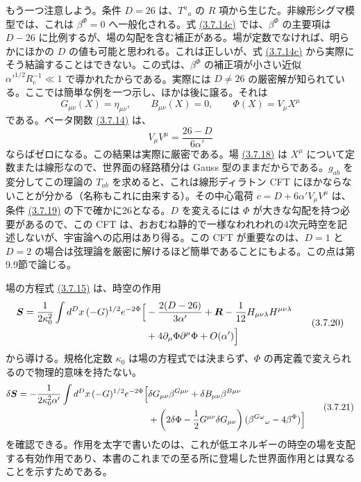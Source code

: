 もう一つ注意しよう。条件 $D=26$ は、$T^a{}_a$ の $R$ 項から生じた。非線形シグマ模型では、これは $\beta^\Phi=0$ へ一般化される。式 \hyperref[eq:3.7.14c]{(3.7.14c)} では、$\beta^\Phi$ の主要項は $D-26$ に比例するが、場の勾配を含む補正がある。場が定数でなければ、明らかにほかの $D$ の値も可能と思われる。これは正しいが、式 \hyperref[eq:3.7.14c]{(3.7.14c)} から実際にそう結論することはできない。この式は、$\beta^\Phi$ の補正項が小さい近似 $\alpha'^{1/2}R_{\mathrm c}^{-1}\ll1$ で導かれたからである。実際には $D\ne26$ の厳密解が知られている。ここでは簡単な例を一つ示し、ほかは後に譲る。それは
\begin{equation}
G_{\mu\nu}(X)=\eta_{\mu\nu},\qquad
B_{\mu\nu}(X)=0,\qquad
\Phi(X)=V_\mu X^\mu
\tag{3.7.18}\label{eq:3.7.18}
\end{equation}
である。ベータ関数 \hyperref[eq:3.7.14a]{(3.7.14)} は、
\begin{equation}
V_\mu V^\mu=\frac{26-D}{6\alpha'}
\tag{3.7.19}\label{eq:3.7.19}
\end{equation}
ならばゼロになる。この結果は実際に厳密である。場 \hyperref[eq:3.7.18]{(3.7.18)} は $X^\mu$ について定数または線形なので、世界面の経路積分は Gauss 型のままだからである。$g_{ab}$ を変分してこの理論の $T_{ab}$ を求めると、これは線形ディラトン CFT にほかならないことが分かる（名称もこれに由来する）。その中心電荷 $c=D+6\alpha'V_\mu V^\mu$ は、条件 \hyperref[eq:3.7.19]{(3.7.19)} の下で確かに26となる。$D$ を変えるには $\Phi$ が大きな勾配を持つ必要があるので、この CFT は、おおむね静的で一様なわれわれの4次元時空を記述しないが、宇宙論への応用はあり得る。この CFT が重要なのは、$D=1$ と $D=2$ の場合は弦理論を厳密に解けるほど簡単であることにもよる。この点は第9.9節で論じる。


場の方程式 \hyperref[eq:3.7.15]{(3.7.15)} は、時空の作用
\begin{equation}
\begin{aligned}
\bm S=\frac1{2\kappa_0^2}\int d^Dx\,(-G)^{1/2}e^{-2\Phi}
\Bigl[&-\frac{2(D-26)}{3\alpha'}+\bm R
-\frac1{12}H_{\mu\nu\lambda}H^{\mu\nu\lambda}\\
&+4\partial_\mu\Phi\partial^\mu\Phi+O(\alpha')\Bigr]
\end{aligned}
\tag{3.7.20}\label{eq:3.7.20}
\end{equation}
から導ける。規格化定数 $\kappa_0$ は場の方程式では決まらず、$\Phi$ の再定義で変えられるので物理的意味を持たない。
\begin{equation}
\begin{aligned}
\delta\bm S=-\frac1{2\kappa_0^2\alpha'}\int d^Dx\,
(-G)^{1/2}e^{-2\Phi}
\Bigl[&\delta G_{\mu\nu}\beta^{G\mu\nu}
+\delta B_{\mu\nu}\beta^{B\mu\nu}\\
&+\left(2\delta\Phi-\frac12G^{\mu\nu}\delta G_{\mu\nu}\right)
(\beta^{G\omega}{}_\omega-4\beta^\Phi)\Bigr]
\end{aligned}
\tag{3.7.21}\label{eq:3.7.21}
\end{equation}
を確認できる。作用を太字で書いたのは、これが低エネルギーの時空の場を支配する有効作用であり、本書のこれまでの至る所に登場した世界面作用とは異なることを示すためである。

